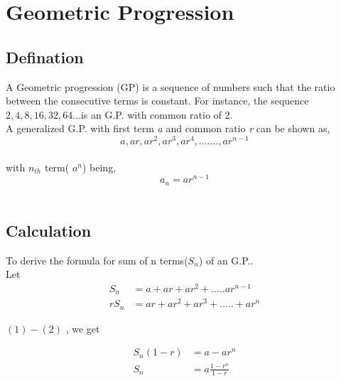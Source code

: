 \documentclass[a4paper,10pt]{article}
\begin{document}

\section{Geometric Progression}
\subsection*{Defination}
A Geometric progression (GP) is a sequence of numbers such that the ratio between the consecutive terms is constant. 
For instance, the sequence $2, 4, 8, 16, 32, 64 … $is an G.P. with common ratio of 2.\cite{wiki2} \\
A generalized G.P. with first term \emph{a} and common ratio \emph{r} can be shown as,
$$a , ar ,  ar^2 ,  ar^3 ,  ar^4 , ....... , ar^{n-1}$$\\
with $n_{th}$ term( $a^n$) being,
$$a_n = ar^{n-1}$$\\

\subsection*{Calculation}
To derive the formula for sum of n terms($S_n$) of an G.P..\\
Let \\
\begin{align}
S_n&= a + ar + ar^2 + ..... ar^{n-1} \\
rS_n&=ar + ar^2 + ar^3 + ..... + ar^n 
\end{align}

$(1) - (2)$ , we get

\begin{align*}
S_n (1 - r) & = a - ar^n\\
S_n & = a \frac{1 - r^n}{1 - r}
\end{align*}


  
\end{document}
